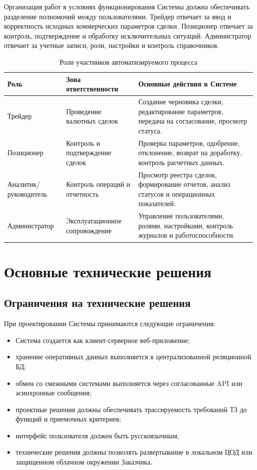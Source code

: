 \documentclass[a4paper,14pt]{extarticle}
\begin{document}
Организация работ в условиях функционирования Системы должна обеспечивать разделение полномочий между пользователями. Трейдер отвечает за ввод и корректность исходных коммерческих параметров сделки. Позиционер отвечает за контроль, подтверждение и обработку исключительных ситуаций. Администратор отвечает за учетные записи, роли, настройки и контроль справочников.

\begin{table}[H]
\centering
\small
\caption{Роли участников автоматизируемого процесса}
\label{tab:roles}
\begin{tabularx}{\linewidth}{|L{35mm}|L{45mm}|X|}
\hline
\textbf{Роль} & \textbf{Зона ответственности} & \textbf{Основные действия в Системе} \\
\hline
Трейдер & Проведение валютных сделок & Создание черновика сделки, редактирование параметров, передача на согласование, просмотр статуса. \\
\hline
Позиционер & Контроль и подтверждение сделок & Проверка параметров, одобрение, отклонение, возврат на доработку, контроль расчетных данных. \\
\hline
Аналитик/руководитель & Контроль операций и отчетность & Просмотр реестра сделок, формирование отчетов, анализ статусов и операционных показателей. \\
\hline
Администратор & Эксплуатационное сопровождение & Управление пользователями, ролями, настройками, контроль журналов и работоспособности. \\
\hline
\end{tabularx}
\end{table}

\section{Основные технические решения}

\subsection{Ограничения на технические решения}
При проектировании Системы принимаются следующие ограничения:
\begin{itemize}[itemsep=1mm]
  \item Система создается как клиент-серверное веб-приложение;
  \item хранение оперативных данных выполняется в централизованной реляционной БД;
  \item обмен со смежными системами выполняется через согласованные API или асинхронные сообщения;
  \item проектные решения должны обеспечивать трассируемость требований ТЗ до функций и приемочных критериев;
  \item интерфейс пользователя должен быть русскоязычным;
  \item технические решения должны позволять развертывание в локальном ЦОД или защищенном облачном окружении Заказчика.
\end{itemize}
\end{document}
